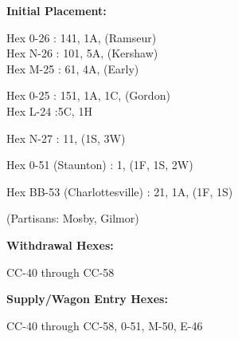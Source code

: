 \begin{scenariodata}
\textbf{Initial Placement:}\\
\end{scenariodata}

\begin{scenariodata}
Hex 0-26 : 141, 1A, (Ramseur)\\
Hex N-26 : 101, 5A, (Kershaw)\\
Hex M-25 : 61, 4A, (Early)\\
\end{scenariodata}

\begin{scenariodata}
Hex 0-25 : 151, 1A, 1C, (Gordon)\\
Hex L-24 :5C, 1H\\
\end{scenariodata}

\begin{scenariodata}
Hex N-27 : 11, (1S, 3W)\\
\end{scenariodata}

\begin{scenariodata}
Hex 0-51 (Staunton) : 1, (1F, 1S, 2W)\\
\end{scenariodata}

\begin{scenariodata}
Hex BB-53 (Charlottesville) : 21, 1A, (1F, 1S)\\
\end{scenariodata}

\begin{scenariodata}
(Partisans: Mosby, Gilmor)\\
\end{scenariodata}

\begin{scenariodata}
\textbf{Withdrawal Hexes:}\\
\end{scenariodata}

\begin{scenariodata}
CC-40 through CC-58\\
\end{scenariodata}

\begin{scenariodata}
\textbf{Supply/Wagon Entry Hexes:}\\
\end{scenariodata}

\begin{scenariodata}
CC-40 through CC-58, 0-51, M-50, E-46\\
\end{scenariodata}


